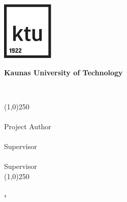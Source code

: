 
\begin{titlepage}
   \begin{center}
   	 

        \vspace*{0.3cm}
        \includegraphics[width=2.46cm]{images/ktu-ikona.pdf}
        \vspace{0.3cm}
		
       \textbf{Kaunas University of Technology}
       \\ \projectFaculty
       
       \bigskip
       \vspace{2cm}
       
       \LARGE
        \textbf{\expandafter\capitalisewords\expandafter{\projectTitle}} \\
        \large
        	\projectType
        
       
%

       \vspace{1cm}
       {\color{lines_name} \line(1,0){250} \\}
       \vspace{1cm}
       \normalsize\textbf{\projectAuthorName} \\
       Project Author
       \vspace{1cm} \\
       \normalsize\textbf{\projectSupervisorNameFirst} \\
       Supervisor
       \vspace{1cm} \\
       \normalsize\textbf{\projectSupervisorNameSecond} \\
       Supervisor
       \vspace{1cm} \\       
       {\color{lines_name} \line(1,0){250} \\}

       \vfill
            
       
       \normalsize{\textbf{\projectCity, \projectYear}}
   \end{center}
\end{titlepage}